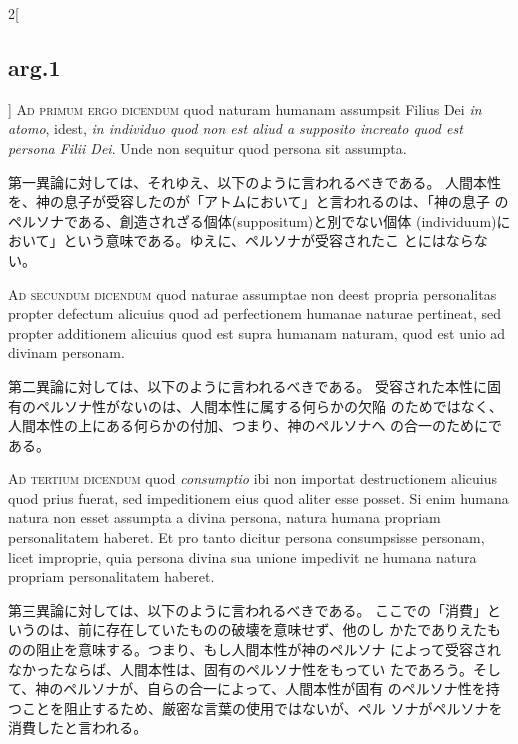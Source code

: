 \documentclass[paper=a4paper,fontsize=10pt,jafontsize=9pt,titlepage]{jlreq}
\begin{document}
\begin{paracol}{2}[\subsection{arg.1}]
{\scshape Ad primum ergo dicendum} quod naturam humanam assumpsit Filius Dei {\itshape in
atomo}, idest, {\itshape in individuo quod non est aliud a supposito increato quod
est persona Filii Dei}. Unde non sequitur quod persona sit assumpta.

\switchcolumn

第一異論に対しては、それゆえ、以下のように言われるべきである。
人間本性を、神の息子が受容したのが「アトムにおいて」と言われるのは、「神の息子
 のペルソナである、創造されざる個体(suppositum)と別でない個体
 (individuum)において」という意味である。ゆえに、ペルソナが受容されたこ
 とにはならない。

\switchcolumn*[\subsection{ad.2}]

{\scshape Ad secundum dicendum} quod naturae assumptae non deest propria
personalitas propter defectum alicuius quod ad perfectionem humanae
naturae pertineat, sed propter additionem alicuius quod est supra
humanam naturam, quod est unio ad divinam personam.

\switchcolumn

第二異論に対しては、以下のように言われるべきである。
受容された本性に固有のペルソナ性がないのは、人間本性に属する何らかの欠陥
 のためではなく、人間本性の上にある何らかの付加、つまり、神のペルソナへ
 の合一のためにである。

\switchcolumn*[\subsection{ad.3}]

{\scshape Ad tertium dicendum} quod {\itshape consumptio} ibi non importat destructionem
alicuius quod prius fuerat, sed impeditionem eius quod aliter esse
posset. Si enim humana natura non esset assumpta a divina persona,
natura humana propriam personalitatem haberet. Et pro tanto dicitur
persona consumpsisse personam, licet improprie, quia persona divina sua
unione impedivit ne humana natura propriam personalitatem haberet.

\switchcolumn

第三異論に対しては、以下のように言われるべきである。
ここでの「消費」というのは、前に存在していたものの破壊を意味せず、他のし
 かたでありえたものの阻止を意味する。つまり、もし人間本性が神のペルソナ
 によって受容されなかったならば、人間本性は、固有のペルソナ性をもってい
 たであろう。そして、神のペルソナが、自らの合一によって、人間本性が固有
 のペルソナ性を持つことを阻止するため、厳密な言葉の使用ではないが、ペル
 ソナがペルソナを消費したと言われる。

\end{paracol}
\newpage
\end{document}

